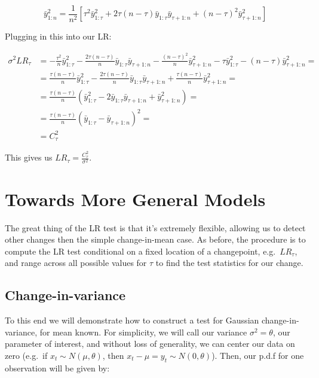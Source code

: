 \documentclass[
  letterpaper,
  DIV=11,
  numbers=noendperiod]{scrreprt}
\begin{document}
\[
\bar{y}_{1:n}^2 = \frac{1}{n^2}  \left[ \tau^2 \bar{y}_{1:\tau}^2 + 2 \tau (n - \tau) \bar{y}_{1:\tau}\bar{y}_{\tau+1:n} + (n - \tau)^2 \bar{y}_{\tau+1:n}^2 \right]
\]

Plugging in this into our LR:

\[
\begin{align}
\sigma^2 LR_\tau &= - \frac{\tau^2}{n} \bar{y}_{1:\tau}^2 - \frac{2 \tau (n - \tau)}{n} \bar{y}_{1:\tau}\bar{y}_{\tau+1:n}  - \frac{(n - \tau)^2}{n} \bar{y}_{\tau+1:n}^2 - \tau \bar{y}_{1:\tau}^2 - (n - \tau) \bar{y}_{\tau+1:n}^2=\\
&=  \frac{\tau (n - \tau)}{n} \bar{y}_{1:\tau}^2 -  \frac{2 \tau (n - \tau)}{n} \bar{y}_{1:\tau}\bar{y}_{\tau+1:n} + \frac{\tau (n - \tau)}{n}  \bar{y}_{\tau+1:n}^2 = \\  
&= \frac{\tau (n - \tau)}{n} (\bar{y}_{1:\tau}^2  - 2 \bar{y}_{1:\tau}\bar{y}_{\tau+1:n} + \bar{y}_{\tau+1:n}^2)=\\
&= \frac{\tau (n - \tau)}{n} (\bar{y}_{1:\tau} - \bar{y}_{\tau+1:n})^2=\\
&= C_\tau^2
\end{align}
\]

This gives us \(LR_\tau = \frac{C_\tau^2}{\sigma^2}\).

\section{Towards More General Models}\label{towards-more-general-models}

The great thing of the LR test is that it's extremely flexible, allowing
us to detect other changes then the simple change-in-mean case. As
before, the procedure is to compute the LR test conditional on a fixed
location of a changepoint, e.g.~\(LR_\tau\), and range across all
possible values for \(\tau\) to find the test statistics for our change.

\subsection{Change-in-variance}\label{change-in-variance}

To this end we will demonstrate how to construct a test for Gaussian
change-in-variance, for mean known. For simplicity, we will call our
variance \(\sigma^2 = \theta\), our parameter of interest, and without
loss of generality, we can center our data on zero (e.g.~if
\(x_t \sim N(\mu, \theta)\), then
\(x_t - \mu = y_t \sim N(0, \theta)\)). Then, our p.d.f for one
observation will be given by:
\end{document}
